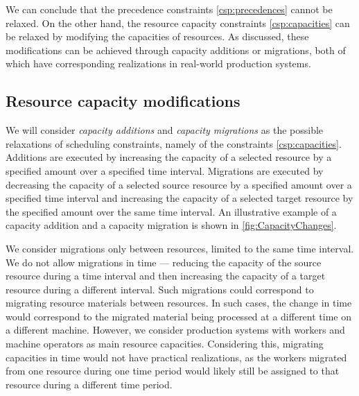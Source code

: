 We can conclude that the precedence constraints \eqref{csp:precedences} cannot be relaxed.
On the other hand, the resource capacity constraints \eqref{csp:capacities}
can be relaxed by modifying the capacities of resources.
As discussed,
these modifications can be achieved through capacity additions or migrations,
both of which have corresponding realizations in real-world production systems.

\subsection{Resource capacity modifications} \label{subsec:problem-statement/bottlenecks/resource-capacity-modifications}

We will consider \emph{capacity additions} and \emph{capacity migrations} as the possible relaxations
of scheduling constraints, namely of the constraints \eqref{csp:capacities}.
Additions are executed by increasing the capacity of a selected resource
by a specified amount over a specified time interval.
Migrations are executed by decreasing the capacity of a selected source resource
by a specified amount over a specified time interval
and increasing the capacity of a selected target resource
by the specified amount over the same time interval.
An illustrative example of a capacity addition and a capacity migration is shown in \cref{fig:CapacityChanges}.

We consider migrations only between resources, limited to the same time interval.
We do not allow migrations in time ---
reducing the capacity of the source resource during a time interval
and then increasing the capacity of a target resource during a different interval.
Such migrations could correspond to migrating resource materials between resources.
In such cases, the change in time would correspond to the migrated material
being processed at a different time on a different machine.
However, we consider production systems with workers and machine operators as main resource capacities.
Considering this, migrating capacities in time would not have practical realizations,
as the workers migrated from one resource during one time period
would likely still be assigned to that resource during a different time period.

